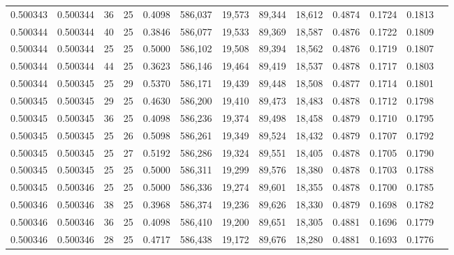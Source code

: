 \begin{tabular}{rrrrrrrrrrrrr}
0.500343 & 0.500344 &    36 &  25 &                                     0.4098 & 586,037 &  19,573 &  89,344 &  18,612 & 0.4874 & 0.1724 & 0.1813 \\
0.500344 & 0.500344 &    40 &  25 &                                     0.3846 & 586,077 &  19,533 &  89,369 &  18,587 & 0.4876 & 0.1722 & 0.1809 \\
0.500344 & 0.500344 &    25 &  25 &                                     0.5000 & 586,102 &  19,508 &  89,394 &  18,562 & 0.4876 & 0.1719 & 0.1807 \\
0.500344 & 0.500344 &    44 &  25 &                                     0.3623 & 586,146 &  19,464 &  89,419 &  18,537 & 0.4878 & 0.1717 & 0.1803 \\
0.500344 & 0.500345 &    25 &  29 &                                     0.5370 & 586,171 &  19,439 &  89,448 &  18,508 & 0.4877 & 0.1714 & 0.1801 \\
0.500345 & 0.500345 &    29 &  25 &                                     0.4630 & 586,200 &  19,410 &  89,473 &  18,483 & 0.4878 & 0.1712 & 0.1798 \\
0.500345 & 0.500345 &    36 &  25 &                                     0.4098 & 586,236 &  19,374 &  89,498 &  18,458 & 0.4879 & 0.1710 & 0.1795 \\
0.500345 & 0.500345 &    25 &  26 &                                     0.5098 & 586,261 &  19,349 &  89,524 &  18,432 & 0.4879 & 0.1707 & 0.1792 \\
0.500345 & 0.500345 &    25 &  27 &                                     0.5192 & 586,286 &  19,324 &  89,551 &  18,405 & 0.4878 & 0.1705 & 0.1790 \\
0.500345 & 0.500345 &    25 &  25 &                                     0.5000 & 586,311 &  19,299 &  89,576 &  18,380 & 0.4878 & 0.1703 & 0.1788 \\
0.500345 & 0.500346 &    25 &  25 &                                     0.5000 & 586,336 &  19,274 &  89,601 &  18,355 & 0.4878 & 0.1700 & 0.1785 \\
0.500346 & 0.500346 &    38 &  25 &                                     0.3968 & 586,374 &  19,236 &  89,626 &  18,330 & 0.4879 & 0.1698 & 0.1782 \\
0.500346 & 0.500346 &    36 &  25 &                                     0.4098 & 586,410 &  19,200 &  89,651 &  18,305 & 0.4881 & 0.1696 & 0.1779 \\
0.500346 & 0.500346 &    28 &  25 &                                     0.4717 & 586,438 &  19,172 &  89,676 &  18,280 & 0.4881 & 0.1693 & 0.1776 \\

\end{tabular}
